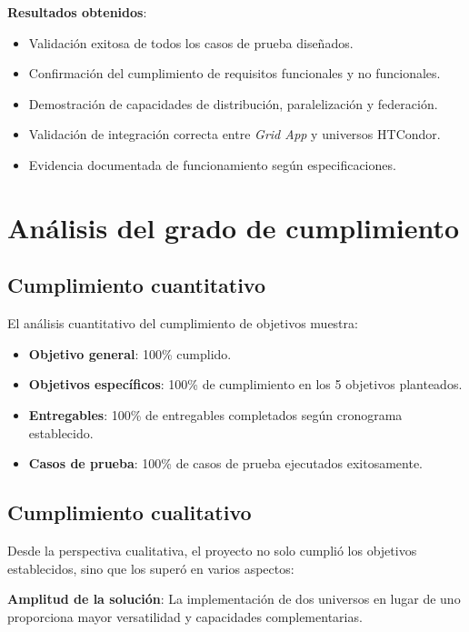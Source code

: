 \textbf{Resultados obtenidos}:
\begin{itemize}
    \item Validación exitosa de todos los casos de prueba diseñados.
    \item Confirmación del cumplimiento de requisitos funcionales y no funcionales.
    \item Demostración de capacidades de distribución, paralelización y federación.
    \item Validación de integración correcta entre \textit{Grid App} y universos HTCondor.
    \item Evidencia documentada de funcionamiento según especificaciones.
\end{itemize}

\section{Análisis del grado de cumplimiento}
\noindent

\subsection{Cumplimiento cuantitativo}
\noindent

El análisis cuantitativo del cumplimiento de objetivos muestra:

\begin{itemize}
    \item \textbf{Objetivo general}: 100\% cumplido.
    \item \textbf{Objetivos específicos}: 100\% de cumplimiento en los 5 objetivos planteados.
    \item \textbf{Entregables}: 100\% de entregables completados según cronograma establecido.
    \item \textbf{Casos de prueba}: 100\% de casos de prueba ejecutados exitosamente.
\end{itemize}

\subsection{Cumplimiento cualitativo}
\noindent

Desde la perspectiva cualitativa, el proyecto no solo cumplió los objetivos establecidos, sino que los superó en varios aspectos:

\textbf{Amplitud de la solución}: La implementación de dos universos en lugar de uno proporciona mayor versatilidad y capacidades complementarias.

